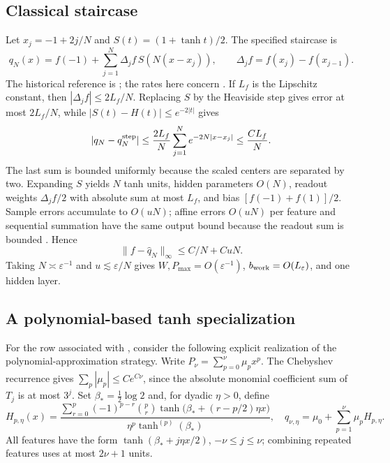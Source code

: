 \subsection{Classical staircase}
Let $x_j=-1+2j/N$ and $S(t)=(1+\tanh t)/2$. The specified staircase is
\begin{equation}
 q_N(x)=f(-1)+\sum_{j=1}^N\Delta_jf\,S(N(x-x_j)),
 \qquad \Delta_jf=f(x_j)-f(x_{j-1}).
 \label{eq:cmp-staircase}
\end{equation}
The historical reference is \cite{58342}; the rates here concern
. If $L_f$ is the Lipschitz constant, then
$|\Delta_jf|\le2L_f/N$. Replacing $S$ by the Heaviside step gives error
at most $2L_f/N$, while $|S(t)-H(t)|\le e^{-2|t|}$ gives
\[
 |q_N-q_N^{\rm step}|\le\frac{2L_f}{N}
       \sum_{j=1}^Ne^{-2N|x-x_j|}\le\frac{CL_f}{N}.
\]
The last sum is bounded uniformly because the scaled centers are separated
by two. Expanding $S$ yields $N$ tanh units, hidden parameters $O(N)$,
readout weights $\Delta_jf/2$ with absolute sum at most $L_f$, and bias
$[f(-1)+f(1)]/2$. Sample errors accumulate to $O(uN)$; affine errors
$O(uN)$ per feature and sequential summation have the same output bound
because the readout sum is bounded \cite[Chs.~3--4]{Higham2002}. Hence
\begin{equation}
 \|f-\widehat q_N\|_\infty\le C/N+CuN.
 \label{eq:cmp-staircase-error}
\end{equation}
Taking $N\asymp\varepsilon^{-1}$ and $u\lesssim\varepsilon/N$ gives
$W,P_{\max}=O(\varepsilon^{-1})$, $b_{\rm work}=O(L_\varepsilon)$,
and one hidden layer.

\subsection{A polynomial-based tanh specialization}
For the row associated with \cite{mhaskar1996approximation}, consider the
following explicit realization of the polynomial-approximation strategy.
Write $P_\nu=\sum_{p=0}^{\nu}\mu_px^p$. The Chebyshev recurrence gives
$\sum_p|\mu_p|\le Ce^{C\nu}$, since the absolute monomial coefficient sum
of $T_j$ is at most $3^j$. Set $\beta_*=\tfrac12\log2$ and, for dyadic
$\eta>0$, define
\begin{equation}
 H_{p,\eta}(x)=
 \frac{\sum_{r=0}^p(-1)^{p-r}\binom pr
       \tanh\!\bigl(\beta_*+(r-p/2)\eta x\bigr)}
      {\eta^p\tanh^{(p)}(\beta_*)},\quad
 q_{\nu,\eta}=\mu_0+\sum_{p=1}^{\nu}\mu_pH_{p,\eta}.
 \label{eq:cmp-mhaskar-features}
\end{equation}
All features have the form $\tanh(\beta_*+j\eta x/2)$,
$-\nu\le j\le\nu$; combining repeated features uses at most $2\nu+1$ units.

